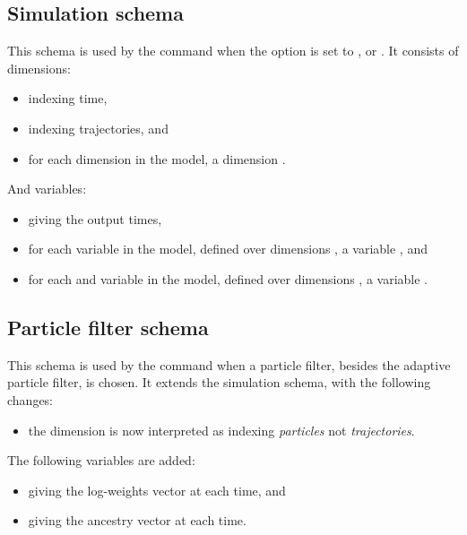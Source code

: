 \subsection{Simulation schema}

This schema is used by the  command when the 
option is set to ,  or . It consists
of dimensions:
\begin{itemize}
\item {} indexing time,
\item {} indexing trajectories, and
\item for each dimension  in the model, a dimension
  .
\end{itemize}
And variables:
\begin{itemize}
\item {} giving the output times,
\item for each  variable  in the model,
  defined over dimensions , a variable
  , and
\item for each  and  variable  in the
  model, defined over dimensions , a variable
  .
\end{itemize}

\subsection{Particle filter schema}

This schema is used by the  command when a particle filter,
besides the adaptive particle filter, is chosen. It extends the simulation
schema, with the following changes:
\begin{itemize}
\item the  dimension is now interpreted as indexing \emph{particles}
  not \emph{trajectories}.
\end{itemize}

The following variables are added:
\begin{itemize}
\item {} giving the log-weights vector at each time, and
\item {} giving the ancestry vector at each time.
\end{itemize}

